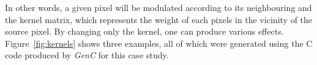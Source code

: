 \documentclass[a4paper,twoside]{article}
\newcommand{\GenC}{\emph{GenC}\xspace}
\newcommand{\RefFig}[1]{Figure~\ref{#1}}
\begin{document}
In other words, a given pixel will be modulated according to its neighbouring
and the kernel matrix, which represents the weight of each pixels in the vicinity
of the source pixel. By changing only the kernel, one can produce various
effects. \RefFig{fig:kernels} shows three examples, all of which were generated
using the C code produced by \GenC for this case study.


\begin{figure}[h!]
\centering
{}
\end{figure}
\end{document}

